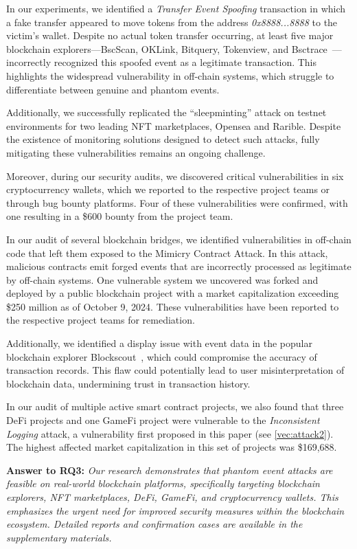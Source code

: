 In our experiments, we identified a \emph{Transfer Event Spoofing} transaction in which a fake transfer appeared to move tokens from the address \textit{0x8888...8888} to the victim's wallet. Despite no actual token transfer occurring, at least five major blockchain explorers—BscScan, OKLink, Bitquery, Tokenview, and Bsctrace~\cite{bscscan,oklink,bitquery,tokenview,bsctrace}—incorrectly recognized this spoofed event as a legitimate transaction. This highlights the widespread vulnerability in off-chain systems, which struggle to differentiate between genuine and phantom events.

Additionally, we successfully replicated the ``sleepminting'' attack on testnet environments for two leading NFT marketplaces, Opensea and Rarible. Despite the existence of monitoring solutions designed to detect such attacks, fully mitigating these vulnerabilities remains an ongoing challenge.

Moreover, during our security audits, we discovered critical vulnerabilities in six cryptocurrency wallets, which we reported to the respective project teams or through bug bounty platforms. Four of these vulnerabilities were confirmed, with one resulting in a \$600 bounty from the project team.

In our audit of several blockchain bridges, we identified vulnerabilities in off-chain code that left them exposed to the Mimicry Contract Attack. In this attack, malicious contracts emit forged events that are incorrectly processed as legitimate by off-chain systems. One vulnerable system we uncovered was forked and deployed by a public blockchain project with a market capitalization exceeding \$250 million as of October 9, 2024. These vulnerabilities have been reported to the respective project teams for remediation.


Additionally, we identified a display issue with event data in the popular blockchain explorer Blockscout~\cite{error_display}, which could compromise the accuracy of transaction records. This flaw could potentially lead to user misinterpretation of blockchain data, undermining trust in transaction history.

In our audit of multiple active smart contract projects, we also found that three DeFi projects and one GameFi project were vulnerable to the \emph{Inconsistent Logging} attack, a vulnerability first proposed in this paper (see \ref{vec:attack2}). The highest affected market capitalization in this set of projects was \$169,688.


\vspace{\baselineskip}
\begin{mdframed}
\noindent\textbf{Answer to RQ3:} \textit{Our research demonstrates that phantom event attacks are feasible on real-world blockchain platforms, specifically targeting blockchain explorers, NFT marketplaces, DeFi, GameFi, and cryptocurrency wallets. This emphasizes the urgent need for improved security measures within the blockchain ecosystem. Detailed reports and confirmation cases are available in the supplementary materials.}
\end{mdframed}



